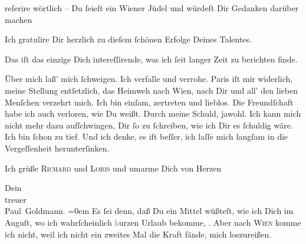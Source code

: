                referire wörtlich – Du{ }ſeieſt ein Wiener Jüdel und
               würdeſt Dir \label{K_L02698-3v}\label{K_L02698-3} Gedanken darüber machen\pend
           
\pstart
           Ich gratulire Dir herzlich zu dieſem{ }ſchönen Erfolge Deines Talentes.\pend
           
\pstart
           Das iſt das einzige Dich intereſſirende, was ich{ }ſeit langer Zeit zu berichten
               finde.\pend
           
\pstart
           Über mich laß’ mich{ }ſchweigen. Ich verfalle und verrohe. Paris iſt mir widerlich, meine Stellung entſetzlich, das
               Heimweh nach Wien, nach Dir und all’ {\pb}den lieben Menſchen verzehrt mich. Ich bin einſam,
               zertreten und lieblos. Die Freundſchaft habe ich auch verloren, wie Du weißt. Durch
               meine Schuld, jawohl. Ich kann mich nicht mehr dazu aufſchwingen, Dir{ }ſo zu{ }ſchreiben, wie ich Dir es{ }ſchuldig wäre. Ich bin{ }ſchon zu tief. Und ich denke, es iſt
               beſſer, ich laſſe mich langſam in die Vergeſſenheit herunterſinken.\pend
           
\pstart
           Ich grüße \textsc{Richard} und \textsc{Loris} und umarme Dich von Herzen\pend
           
\pstart
           Dein {\\[\baselineskip]}treuer {\\[\baselineskip]}\spacefill\mbox{Paul Goldmann.}\pend
           \leftskip=0em{}
\pstart
           \noindent{}{\pb}Es{ }ſei denn, daß Du ein Mittel wüßteſt, wie ich
                  Dich im Auguſt, wo ich wahrſcheinlich
                     \textcolor{gray}{k}urzen Urlaub bekomme, \label{K_L02698-4v}\label{K_L02698-4}. Aber nach \textsc{Wien} komme ich nicht, weil ich nicht ein zweites Mal die Kraft fände, mich
                  loszureißen.\pend
           
